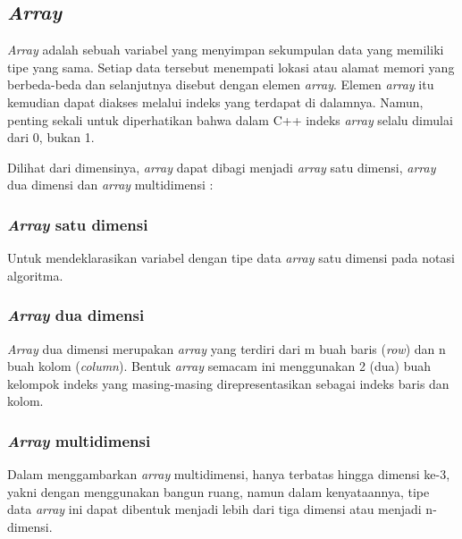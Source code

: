 \documentclass{subfiles}
\begin{document}
    \subsection{\textit{Array}}
    \textit{Array} adalah sebuah variabel yang menyimpan sekumpulan data yang memiliki tipe yang sama. Setiap data tersebut menempati lokasi atau alamat memori yang berbeda-beda dan selanjutnya disebut dengan elemen \textit{array}. Elemen \textit{array} itu kemudian dapat diakses melalui indeks yang terdapat di dalamnya. Namun, penting sekali untuk diperhatikan bahwa dalam C++ indeks \textit{array} selalu dimulai dari 0, bukan 1\parencite{raharjo2015pemrograman}.

    Dilihat dari dimensinya, \textit{array} dapat dibagi menjadi \textit{array} satu dimensi, \textit{array} dua dimensi dan \textit{array} multidimensi \parencite{faradiba2019penggunaan}:
    \subsubsection{\textit{Array} satu dimensi}
    \begin{indentlevel0}
        Untuk mendeklarasikan variabel dengan tipe data \textit{array} satu dimensi pada notasi algoritma.
    \end{indentlevel0}
    \subsubsection{\textit{Array} dua dimensi}
    \begin{indentlevel0}
        \textit{Array} dua dimensi merupakan \textit{array} yang terdiri dari m buah baris (\textit{row}) dan n buah kolom (\textit{column}). Bentuk \textit{array} semacam ini menggunakan 2 (dua) buah kelompok indeks yang masing-masing direpresentasikan sebagai indeks baris dan kolom.
    \end{indentlevel0}
    \subsubsection{\textit{Array} multidimensi}
    \begin{indentlevel0}
        Dalam menggambarkan \textit{array} multidimensi, hanya terbatas hingga dimensi ke-3, yakni dengan menggunakan bangun ruang, namun dalam kenyataannya, tipe data \textit{array} ini dapat dibentuk menjadi lebih dari tiga dimensi atau menjadi n-dimensi.
    \end{indentlevel0}
\end{document}
